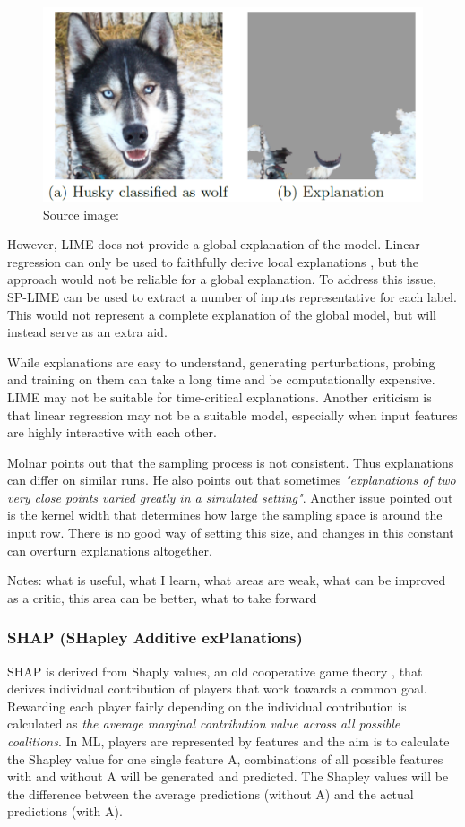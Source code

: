 \documentclass[proposal]{softeng}
\begin{document}
\begin{figure}[h!]
\centering

\includegraphics[width=.4\textwidth]{images/lime_paper_huskey.png}

\caption{Source image: \cite{RibeiroMarcoTulio2016WSIT}}

\label{fig:lime_paper_huskey}
\end{figure}

However, LIME does not provide a global explanation of the model. Linear regression can only be used to faithfully derive local explanations , but the approach would not be reliable for a global explanation. To address this issue, SP-LIME can be used to extract a number of inputs representative for each label. This would not represent a complete explanation of the global model, but will instead serve as an extra aid.

While explanations are easy to understand, generating perturbations, probing and training on them can take a long time and be computationally expensive. LIME may not be suitable for time-critical explanations. Another criticism is that linear regression may not be a suitable model, especially when input features are highly interactive with each other.

Molnar \cite{molnar2019} points out that the sampling process is not consistent. Thus explanations can differ on similar runs. He also points out that sometimes \textit{"explanations of two very close points varied greatly in a simulated setting"}. Another issue pointed out is the kernel width that determines how large the sampling space is around the input row. There is no good way of setting this size, and changes in this constant can overturn explanations altogether.

Notes:
what is useful, what I learn, what areas are weak, what can be improved
as a critic, this area can be better, what to take forward

\subsubsection{SHAP (SHapley Additive exPlanations)}
SHAP\cite{LundbergScott2017AUAt} is derived from Shaply values, an old cooperative game theory \cite{shapley-value}, that derives individual contribution of players that work towards a common goal. Rewarding each player fairly depending on the individual contribution is calculated as \textit{the average marginal contribution value across all possible coalitions}\cite{molnar2019}. In ML, players are represented by features and the aim is to calculate the Shapley value for one single feature A, combinations of all possible features with and without A will be generated and predicted. The Shapley values will be the difference between the average predictions (without A) and the actual predictions (with A).
\end{document}

